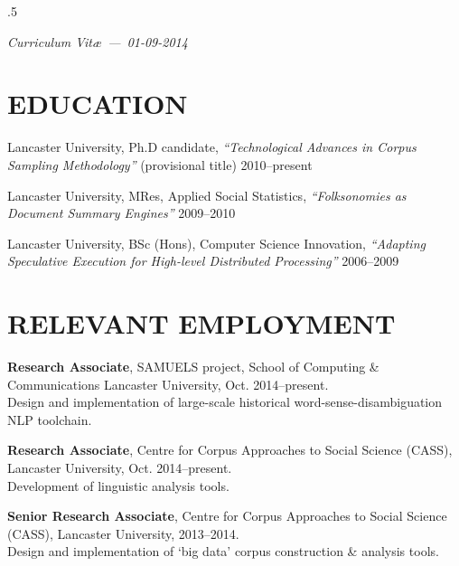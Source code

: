 \documentclass{res}
\begin{document}
 
\thispagestyle{empty} %
\address{\\
\texttt{<steve@stephenwattam.com>}\\
\texttt{http://stephenwattam.com/}}


\begin{resume}
\vspace{0.2in}
\moveleft.5\sectionwidth\centerline{\it Curriculum Vit\ae~---~01-09-2014}  

\section{EDUCATION}
\vspace{0.1in} 
 
    Lancaster University, Ph.D candidate,
    \textit{``Technological Advances in Corpus Sampling Methodology''} (provisional title)
    2010--present

    Lancaster University, MRes,
    Applied Social Statistics, 
    \textit{``Folksonomies as Document Summary \mbox{Engines}''}
    2009--2010

    Lancaster University, BSc (Hons),
    Computer Science Innovation, 
    \textit{``Adapting Speculative Execution for High-level Distributed Processing''}
    2006--2009



\section{RELEVANT EMPLOYMENT} 
\vspace{0.1in} 

    
    {\bf Research Associate},
    SAMUELS project, School of Computing \& Communications
    Lancaster University,
    Oct. 2014--present.\\
    Design and implementation of large-scale historical word-sense-disambiguation NLP toolchain.

    
    {\bf Research Associate},
    Centre for Corpus Approaches to Social Science (CASS),
    Lancaster University,
    Oct. 2014--present.\\
    Development of linguistic analysis tools.




    {\bf Senior Research Associate},
    Centre for Corpus Approaches to Social Science (CASS),
    Lancaster University,
    2013--2014.\\
    Design and implementation of `big data' corpus construction \& analysis tools.


\end{resume}
\end{document}
